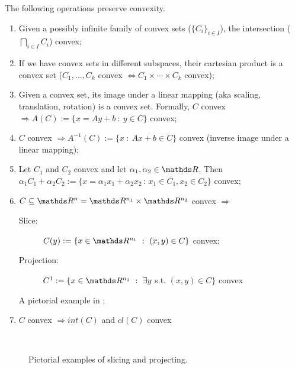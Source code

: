 \documentclass[computational_mathematics.tex]{subfiles}
\begin{document}
\begin{proposition}
The following operations preserve convexity.
\begin{enumerate}
  \item Given a possibly infinite family of convex sets (${\{C_i\}}_{i \in I}$), the intersection ($\bigcap_{i \in I} C_i$) convex;
  
  \item If we have convex sets in different subspaces, their cartesian product is a convex set ($C_1, \ldots, C_k$ convex $\iff C_1 \times \cdots \times C_k$ convex);
  
  \item Given a convex set, its image under a linear mapping (aka scaling, translation, rotation) is a convex set. Formally, $C$ convex $\Longrightarrow A(C) := \{x = Ay + b~:~y \in C\}$ convex; 
  
  \item $C$ convex $\Longrightarrow A^{-1}(C) := \{x~:~Ax + b \in C\}$ convex (inverse image under a linear mapping);
  
  \item Let $C_1$ and $C_2$ convex and let $\alpha_1, \alpha_2 \in \R$. Then $\alpha_1 C_1 + \alpha_2 C_2 := \{ x = \alpha_1 x_1 + \alpha_2 x_2 \,:\, x_1 \in C_1, x_2 \in C_2\}$ convex;
  \item $C \subseteq \R^n = \R^{n_1} \times \R^{n_2}$ convex $\Longrightarrow$
  \begin{description}
    \item[{\small \sc Slice:}] $C(y) := \{x \in \R^{n_1}~:~(x, y) \in C\}$ convex;
    \item[{\small \sc Projection:}] $C^1 := \{x \in \R^{n_1}~:~\exists y$ s.t. $(x, y) \in C\}$ convex
  \end{description}
    A pictorial example in ;
  \item $C$ convex $\Longrightarrow int(C)$ and $cl(C)$ convex
\end{enumerate}
\end{proposition}

\begin{figure}[h]
  \centering
  \hspace{0.5cm}
  \\
  \caption{Pictorial examples of slicing and projecting.}\label{fig:5ott_3}
\end{figure}
\end{document}
